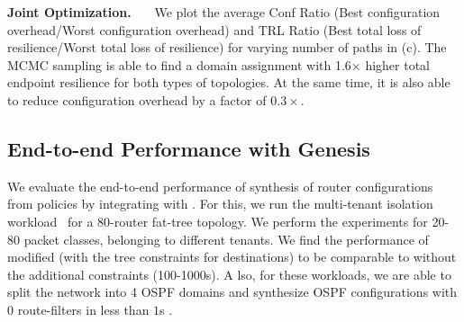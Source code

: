 \noindent\textbf{Joint Optimization.}~~~
We plot the average Conf Ratio 
(Best configuration overhead/Worst configuration overhead) and TRL
Ratio (Best total loss of resilience/Worst total loss of resilience)
for varying number of paths in (c). The MCMC
sampling is able to find a domain assignment
with 1.6$\times$ higher total endpoint resilience for both types
of topologies. At the same time, it is also able to reduce configuration
overhead by a factor of $0.3\times$. 


\subsection{End-to-end Performance with Genesis} \label{sec:genzep}
We evaluate the end-to-end performance 
of synthesis of router configurations from policies 
by integrating \name with \genesis. For this, we run
the multi-tenant isolation workload~\cite{genesis} for
a 80-router fat-tree topology. We perform the experiments
for 20-80 packet classes, belonging to different tenants. 
We find the performance of modified \genesis (with the tree
constraints for destinations) to be comparable to \genesis 
without the additional constraints (100-1000s). A
lso, for these workloads, we are able to 
split the network into 4 OSPF domains and synthesize OSPF
configurations with 0 route-filters in less than $1$s .
